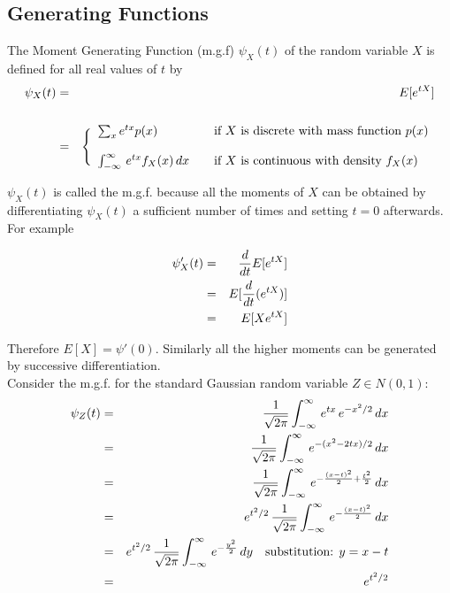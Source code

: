 \subsection{Generating Functions}
\label{sec:generating}

The Moment Generating Function  (m.g.f) $\psi_X(t)$ of the random variable $X$ is defined for all real values of $t$ by
\begin{eqnarray*}
\psi_X(t) &=& E[e^{tX}] \\ \\
&=&\Bigg\{
\begin{array}{ll}
\sum_x e^{tx} p(x) & \quad  \hbox {if $X$ is discrete with mass function $p(x)$} \\ \\
\int_{-\infty}^{\infty}\, e^{tx} f_X(x) \, dx & \quad \hbox{if $X$ is continuous with density $f_X(x)$} \\
\end{array}
\end{eqnarray*}

$\psi_X(t)$ is called the m.g.f. because all the moments of $X$ can be obtained by differentiating $\psi_X(t)$ a sufficient number of times and setting $t=0$ afterwards. For example 

\begin{eqnarray*}
\psi_X'(t) &=& {d\over dt} E[e^{tX}] \\
&=& E[{d\over dt} (e^{tX})] \\
&=& E[X e^{tX}]
\end{eqnarray*} 

Therefore $E[X] = \psi'(0)$. Similarly all the higher moments can be generated by successive differentiation.\\
 
Consider the m.g.f. for the standard Gaussian random variable $Z \in N(0,1)$:
\begin{eqnarray*}
\psi_Z(t) &=& {1\over \sqrt{2\pi}} \int_{-\infty}^{\infty}\, e^{tx}\, e^{-x^2/2}\, dx\\
               &=& {1\over \sqrt{2\pi}} \int_{-\infty}^{\infty}\, e^{-(x^2 - 2 tx)/2}\, dx\\
               &=& {1\over \sqrt{2\pi}} \int_{-\infty}^{\infty}\, e^{-{(x-t)^2\over2} + {t^2\over2}} \, dx\\
               &=& e^{t^2/2}\, {1\over \sqrt{2\pi}} \int_{-\infty}^{\infty}\, e^{-{(x-t)^2\over2}}\, dx\\
               &=& e^{t^2/2}\, {1\over \sqrt{2\pi}} \int_{-\infty}^{\infty}\, e^{-{y^2\over2}}\, dy \quad\hbox{substitution: $y = x-t$}\\
               &=& e^{t^2/2}
\end{eqnarray*}

